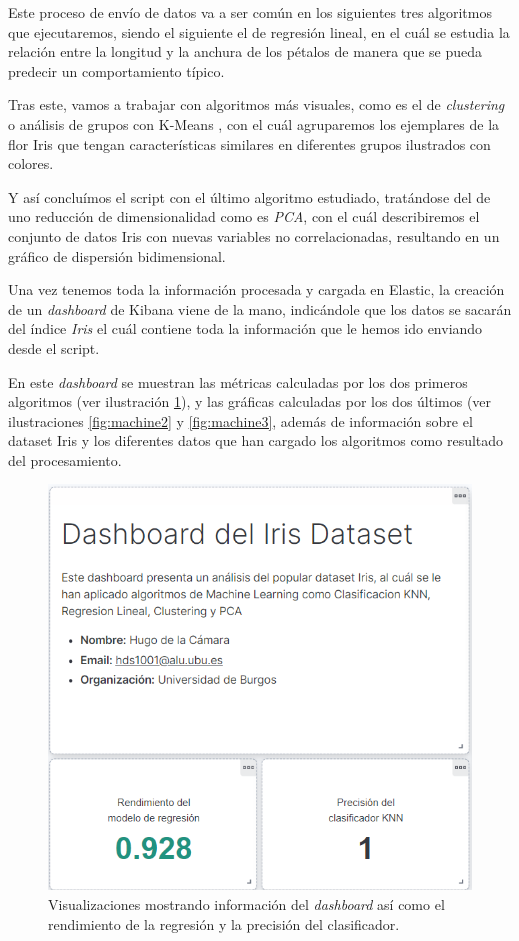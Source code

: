 Este proceso de envío de datos va a ser común en los siguientes tres algoritmos que ejecutaremos, siendo el siguiente el de regresión lineal\cite{regresion}, en el cuál se estudia la relación entre la longitud y la anchura de los pétalos de manera que se pueda predecir un comportamiento típico. 

Tras este, vamos a trabajar con algoritmos más visuales, como es el de \textit{clustering} o análisis de grupos con K-Means\cite{clustering} , con el cuál agruparemos los ejemplares de la flor Iris que tengan características similares en diferentes grupos ilustrados con colores. 

Y así concluímos el script con el último algoritmo estudiado, tratándose del de uno reducción de dimensionalidad como es \textit{PCA}\cite{pca}, con el cuál describiremos el conjunto de datos Iris con nuevas variables no correlacionadas, resultando en un gráfico de dispersión bidimensional.

Una vez tenemos toda la información procesada y cargada en Elastic, la creación de un \textit{dashboard} de Kibana viene de la mano, indicándole que los datos se sacarán del índice \textit{Iris} el cuál contiene toda la información que le hemos ido enviando desde el script.

En este \textit{dashboard} se muestran las métricas calculadas por los dos primeros algoritmos  (ver ilustración  \ref{fig:machine1}), y las gráficas calculadas por los dos últimos  (ver ilustraciones  \ref{fig:machine2} y \ref{fig:machine3}, además de información sobre el dataset Iris y los diferentes datos que han cargado los algoritmos como resultado del procesamiento.

\begin{figure}
    \centering
    \includegraphics[width=1\linewidth]{img/iris12.png}
    \caption{Visualizaciones mostrando información del \textit{dashboard} así como el rendimiento de la regresión y la precisión del clasificador.}
    \label{fig:machine1}
\end{figure}


